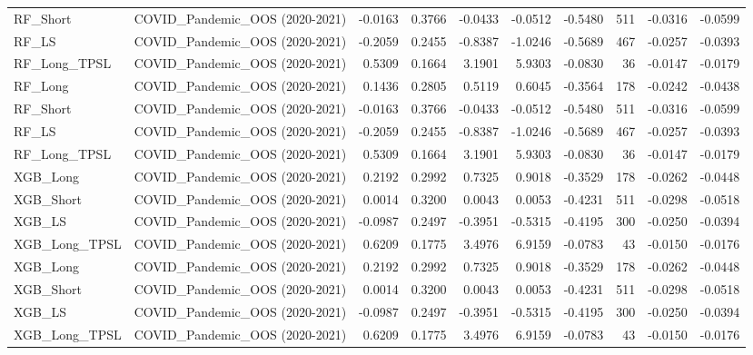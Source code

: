 \begin{tabular}{llrrrrrrrr}
\cline{1-10}
RF\_Short & COVID\_Pandemic\_OOS (2020-2021) & -0.0163 & 0.3766 & -0.0433 & -0.0512 & -0.5480 & 511 & -0.0316 & -0.0599 \\
\cline{1-10}
RF\_LS & COVID\_Pandemic\_OOS (2020-2021) & -0.2059 & 0.2455 & -0.8387 & -1.0246 & -0.5689 & 467 & -0.0257 & -0.0393 \\
\cline{1-10}
RF\_Long\_TPSL & COVID\_Pandemic\_OOS (2020-2021) & 0.5309 & 0.1664 & 3.1901 & 5.9303 & -0.0830 & 36 & -0.0147 & -0.0179 \\
\cline{1-10}
RF\_Long & COVID\_Pandemic\_OOS (2020-2021) & 0.1436 & 0.2805 & 0.5119 & 0.6045 & -0.3564 & 178 & -0.0242 & -0.0438 \\
\cline{1-10}
RF\_Short & COVID\_Pandemic\_OOS (2020-2021) & -0.0163 & 0.3766 & -0.0433 & -0.0512 & -0.5480 & 511 & -0.0316 & -0.0599 \\
\cline{1-10}
RF\_LS & COVID\_Pandemic\_OOS (2020-2021) & -0.2059 & 0.2455 & -0.8387 & -1.0246 & -0.5689 & 467 & -0.0257 & -0.0393 \\
\cline{1-10}
RF\_Long\_TPSL & COVID\_Pandemic\_OOS (2020-2021) & 0.5309 & 0.1664 & 3.1901 & 5.9303 & -0.0830 & 36 & -0.0147 & -0.0179 \\
\cline{1-10}
XGB\_Long & COVID\_Pandemic\_OOS (2020-2021) & 0.2192 & 0.2992 & 0.7325 & 0.9018 & -0.3529 & 178 & -0.0262 & -0.0448 \\
\cline{1-10}
XGB\_Short & COVID\_Pandemic\_OOS (2020-2021) & 0.0014 & 0.3200 & 0.0043 & 0.0053 & -0.4231 & 511 & -0.0298 & -0.0518 \\
\cline{1-10}
XGB\_LS & COVID\_Pandemic\_OOS (2020-2021) & -0.0987 & 0.2497 & -0.3951 & -0.5315 & -0.4195 & 300 & -0.0250 & -0.0394 \\
\cline{1-10}
XGB\_Long\_TPSL & COVID\_Pandemic\_OOS (2020-2021) & 0.6209 & 0.1775 & 3.4976 & 6.9159 & -0.0783 & 43 & -0.0150 & -0.0176 \\
\cline{1-10}
XGB\_Long & COVID\_Pandemic\_OOS (2020-2021) & 0.2192 & 0.2992 & 0.7325 & 0.9018 & -0.3529 & 178 & -0.0262 & -0.0448 \\
\cline{1-10}
XGB\_Short & COVID\_Pandemic\_OOS (2020-2021) & 0.0014 & 0.3200 & 0.0043 & 0.0053 & -0.4231 & 511 & -0.0298 & -0.0518 \\
\cline{1-10}
XGB\_LS & COVID\_Pandemic\_OOS (2020-2021) & -0.0987 & 0.2497 & -0.3951 & -0.5315 & -0.4195 & 300 & -0.0250 & -0.0394 \\
\cline{1-10}
XGB\_Long\_TPSL & COVID\_Pandemic\_OOS (2020-2021) & 0.6209 & 0.1775 & 3.4976 & 6.9159 & -0.0783 & 43 & -0.0150 & -0.0176 \\

\end{tabular}
